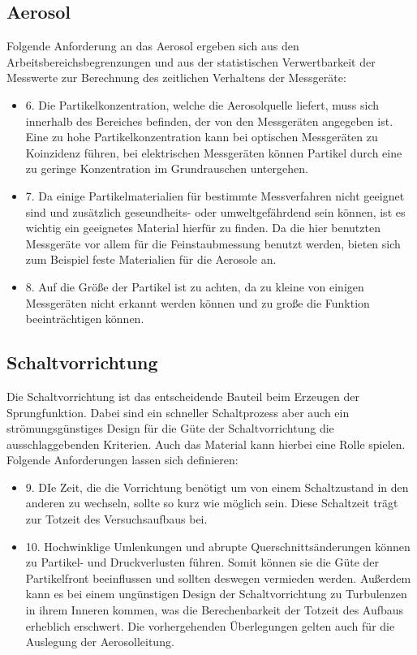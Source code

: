 \subsection{Aerosol}
Folgende Anforderung an das Aerosol ergeben sich aus den Arbeitsbereichsbegrenzungen und aus der statistischen Verwertbarkeit der Messwerte zur Berechnung des zeitlichen Verhaltens der Messger\"{a}te:

\begin{itemize}
\item 6. Die Partikelkonzentration, welche die Aerosolquelle liefert, muss sich innerhalb des Bereiches befinden, der von den Messger\"{a}ten angegeben ist. Eine zu hohe Partikelkonzentration kann bei optischen Messger\"{a}ten zu Koinzidenz f\"{u}hren, bei elektrischen Messger\"{a}ten k\"{o}nnen Partikel durch eine zu geringe Konzentration im Grundrauschen untergehen.

\item 7. Da einige Partikelmaterialien f\"{u}r bestimmte Messverfahren nicht geeignet sind und zus\"{a}tzlich geseundheits- oder umweltgef\"{a}hrdend sein k\"{o}nnen, ist es wichtig ein geeignetes Material hierf\"{u}r zu finden. Da die hier benutzten Messgeräte vor allem für die Feinstaubmessung benutzt werden, bieten sich zum Beispiel feste Materialien für die Aerosole an.

\item 8. Auf die Gr\"{o}{\ss}e der Partikel ist zu achten, da zu kleine von einigen Messger\"{a}ten nicht erkannt werden k\"{o}nnen und zu gro{\ss}e die Funktion beeintr\"{a}chtigen k\"{o}nnen.
\end{itemize}

\subsection{Schaltvorrichtung}
Die Schaltvorrichtung ist das entscheidende Bauteil beim Erzeugen der Sprungfunktion. Dabei sind ein schneller Schaltprozess aber auch ein str\"{o}mungsg\"{u}nstiges Design für die G\"{u}te der Schaltvorrichtung die ausschlaggebenden Kriterien. Auch das Material kann hierbei eine Rolle spielen. Folgende Anforderungen lassen sich definieren:

\begin{itemize}
	\item 9. DIe Zeit, die die Vorrichtung ben\"{o}tigt um von einem Schaltzustand in den anderen zu wechseln, sollte so kurz wie m\"{o}glich sein. Diese Schaltzeit tr\"{a}gt zur Totzeit des Versuchsaufbaus bei. 
	
	\item 10. Hochwinklige Umlenkungen und abrupte Querschnitts\"{a}nderungen k\"{o}nnen zu Partikel- und Druckverlusten f\"{u}hren. Somit k\"{o}nnen sie die G\"{u}te der Partikelfront beeinflussen und sollten deswegen vermieden werden. Au{\ss}erdem kann es bei einem ung\"{u}nstigen Design der Schaltvorrichtung zu Turbulenzen in ihrem Inneren kommen, was die Berechenbarkeit der Totzeit des Aufbaus erheblich erschwert. Die vorhergehenden \"{U}berlegungen gelten auch für die Auslegung der Aerosolleitung.
\end{itemize}

